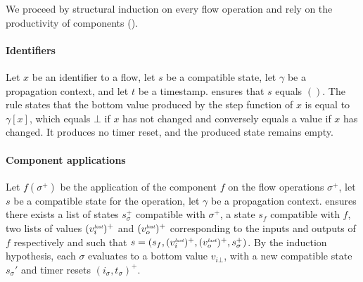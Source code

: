 \begin{skippableproof}
    We proceed by structural induction on every flow operation and rely on the productivity of
    components ().

    \paragraph{Identifiers}
    Let $x$ be an identifier to a flow, let $s$ be a compatible state, let $\gamma$ be a propagation
    context, and let $t$ be a timestamp.
     ensures that $s$ equals $()$.
    The rule  states that the bottom value produced by
    the step function of $x$ is equal to $\gamma[x]$, which equals $\bot$ if $x$ has not changed and
    conversely equals a value if $x$ has changed.
    It produces no timer reset, and the produced state remains empty.

    \paragraph{Component applications}
    Let $f(\sigma^+)$ be the application of the component $f$ on the flow operations $\sigma^+$, let
    $s$ be a compatible state for the operation, let $\gamma$ be a propagation context.
     ensures there exists a list of states
    $s_\sigma^+$ compatible with $\sigma^+$, a state $s_f$ compatible with $f$, two lists of values
    $(v_i^{\textit{\tiny last}})^+$ and $(v_o^{\textit{\tiny last}})^+$ corresponding to the inputs and outputs of $f$
    respectively and such that $s = (s_f, (v_i^{\textit{\tiny last}})^+, (v_o^{\textit{\tiny last}})^+, s_\sigma^+)$.
    By the induction hypothesis, each $\sigma$ evaluates to a bottom value $v_{i\bot}$, with a new
    compatible state $s_\sigma'$ and timer resets $(i_\sigma, t_\sigma)^+$.


\end{skippableproof}
